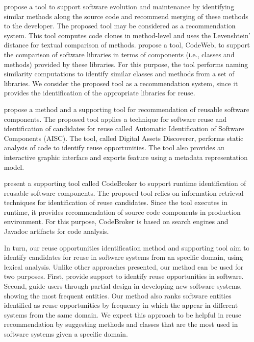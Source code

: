 \cite{mende2009evaluation} propose a tool to support software evolution and maintenance by identifying similar methods along the source code and recommend merging of these methods to the developer. The proposed tool may be considered as a recommendation system. This tool computes code clones in method-level and uses the Levenshtein’ distance for textual comparison of methods. \cite{michail1999assessing} propose a tool, CodeWeb, to support the comparison of software libraries in terms of components (i.e., classes and methods) provided by these libraries. For this purpose, the tool performs naming similarity computations to identify similar classes and methods from a set of libraries. We consider the proposed tool as a recommendation system, since it provides the identification of the appropriate libraries for reuse. 

\cite{oliveira2007automatic} propose a method and a supporting tool for recommendation of reusable software components. The proposed tool applies a technique for software reuse and identification of candidates for reuse called Automatic Identification of Software Components (AISC). The tool, called Digital Assets Discoverer, performs static analysis of code to identify reuse opportunities. The tool also provides an interactive graphic interface and exports feature using a metadata representation model. 

\cite{Ye:2005} present a supporting tool called CodeBroker to support runtime identification of reusable software components.  The proposed tool relies on information retrieval techniques for identification of reuse candidates. Since the tool executes in runtime, it provides recommendation of source code components in production environment. For this purpose, CodeBroker is based on search engines and Javadoc artifacts for code analysis.

In turn, our reuse opportunities identification  method and supporting tool aim to identify candidates for reuse in software systems from an specific domain, using lexical analysis. Unlike other approaches presented, our method can be used for two purposes. First, provide support to identify reuse opportunities in software. Second, guide users through partial design in developing new software systems, showing the most frequent entities. Our method also ranks software  entities  identified as  reuse opportunities by frequency in which the appear in different systems from the same domain. We expect this approach to be helpful in reuse recommendation by suggesting methods and classes that are the most used in software systems given a specific domain.



